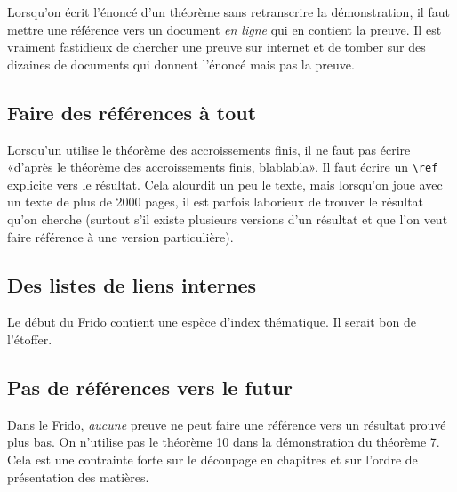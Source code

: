 Lorsqu'on écrit l'énoncé d'un théorème sans retranscrire la démonstration, il faut mettre une référence vers un document \emph{en ligne} qui en contient la preuve. Il est vraiment fastidieux de chercher une preuve sur internet et de tomber sur des dizaines de documents qui donnent l'énoncé mais pas la preuve.

\subsection{Faire des références à tout}

Lorsqu'un utilise le théorème des accroissements finis, il ne faut pas écrire «d'après le théorème des accroissements finis, blablabla». Il faut écrire un \verb+\ref+ explicite vers le résultat. Cela alourdit un peu le texte, mais lorsqu'on joue avec un texte de plus de 2000 pages, il est parfois laborieux de trouver le résultat qu'on cherche (surtout s'il existe plusieurs versions d'un résultat et que l'on veut faire référence à une version particulière).

\subsection{Des listes de liens internes}

Le début du Frido contient une espèce d'index thématique. Il serait bon de l'étoffer.

\subsection{Pas de références vers le futur}

Dans le Frido, \emph{aucune} preuve ne peut faire une référence vers un résultat prouvé plus bas. On n'utilise pas le théorème 10 dans la démonstration du théorème 7. Cela est une contrainte forte sur le découpage en chapitres et sur l'ordre de présentation des matières.

